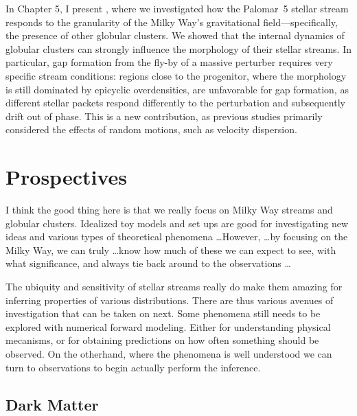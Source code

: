     In Chapter 5, I present \citet{2025A&A...699A.289F}, where we investigated how the Palomar~5 stellar stream responds to the granularity of the Milky Way's gravitational field—specifically, the presence of other globular clusters. We showed that the internal dynamics of globular clusters can strongly influence the morphology of their stellar streams. In particular, gap formation from the fly-by of a massive perturber requires very specific stream conditions: regions close to the progenitor, where the morphology is still dominated by epicyclic overdensities, are unfavorable for gap formation, as different stellar packets respond differently to the perturbation and subsequently drift out of phase. This is a new contribution, as previous studies primarily considered the effects of random motions, such as velocity dispersion.

\section{Prospectives}

    I think the good thing here is that we really focus on Milky Way streams and globular clusters. Idealized toy models and set ups are good for investigating new ideas and various types of theoretical phenomena \dots However, \dots by focusing on the Milky Way, we can truly \dots know how much of these we can expect to see, with what significance, and always tie back around to the observations \dots

    The ubiquity and sensitivity of stellar streams really do make them amazing for inferring properties of various distributions. There are thus various avenues of investigation that can be taken on next. Some phenomena still needs to be explored with numerical forward modeling. Either for understanding physical mecanisms, or for obtaining predictions on how often something should be observed. On the otherhand, where the phenomena is well understood we can turn to observations to begin actually perform the inference. 

    \subsection{Dark Matter}

